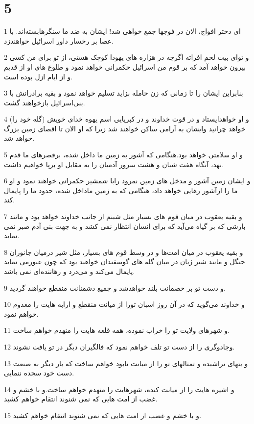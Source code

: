 \chapter{5}

\par 1 ای دختر افواج، الان در فوجها جمع خواهی شد! ایشان به ضد ما سنگرهابسته‌اند. با عصا بر رخسار داور اسرائیل خواهندزد.
\par 2 و تو‌ای بیت لحم افراته اگر‌چه در هزاره های یهودا کوچک هستی، از تو برای من کسی بیرون خواهد آمد که بر قوم من اسرائیل حکمرانی خواهد نمود و طلوع های او از قدیم و از ایام ازل بوده است.
\par 3 بنابراین ایشان را تا زمانی که زن حامله بزاید تسلیم خواهد نمود و بقیه برادرانش با بنی‌اسرائیل بازخواهند گشت.
\par 4 و او خواهدایستاد و در قوت خداوند و در کبریایی اسم یهوه خدای خویش (گله خود را) خواهد چرانید وایشان به آرامی ساکن خواهند شد زیرا که او الان تا اقصای زمین بزرگ خواهد شد.
\par 5 و او سلامتی خواهد بود.هنگامی که آشور به زمین ما داخل شده، برقصرهای ما قدم نهد، آنگاه هفت شبان و هشت سرور آدمیان را به مقابل او برپا خواهیم داشت.
\par 6 و ایشان زمین آشور و مدخل های زمین نمرود رابا شمشیر حکمرانی خواهند نمود و او ما را ازآشور رهایی خواهد داد، هنگامی که به زمین ماداخل شده، حدود ما را پایمال کند.
\par 7 و بقیه یعقوب در میان قوم های بسیار مثل شبنم از جانب خداوند خواهد بود و مانند بارشی که بر گیاه می‌آید که برای انسان انتظار نمی کشد و به جهت بنی آدم صبر نمی نماید.
\par 8 و بقیه یعقوب در میان امت‌ها و در وسط قوم های بسیار، مثل شیر درمیان جانوران جنگل و مانند شیر ژیان در میان گله های گوسفندان خواهند بود که چون عبورمی نماید پایمال می‌کند و می‌درد و رهاننده‌ای نمی باشد.
\par 9 و دست تو بر خصمانت بلند خواهدشد و جمیع دشمنانت منقطع خواهند گردید.
\par 10 و خداوند می‌گوید که در آن روز اسبان تورا از میانت منقطع و ارابه هایت را معدوم خواهم نمود.
\par 11 و شهرهای ولایت تو را خراب نموده، همه قلعه هایت را منهدم خواهم ساخت.
\par 12 وجادوگری را از دست تو تلف خواهم نمود که فالگیران دیگر در تو یافت نشوند.
\par 13 و بتهای تراشیده و تمثالهای تو را از میانت نابود خواهم ساخت که بار دیگر به صنعت دست خود سجده ننمایی.
\par 14 و اشیره هایت را از میانت کنده، شهرهایت را منهدم خواهم ساخت.و با خشم و غضب از امت هایی که نمی شنوند انتقام خواهم کشید.
\par 15 و با خشم و غضب از امت هایی که نمی شنوند انتقام خواهم کشید.

